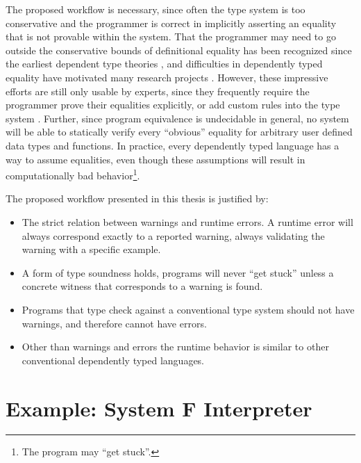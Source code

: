 The proposed workflow is necessary, since often the type system is too conservative and the programmer is correct in implicitly asserting an equality that is not provable within the system.
That the programmer may need to go outside the conservative bounds of definitional equality has been recognized since the earliest dependent type theories \cite{Martin-Lof-1972}, and difficulties in dependently typed equality have motivated many research projects \cite{HoTTbook,sjoberg2015programming,cockx2021taming}.
However, these impressive efforts are still only usable by experts, since they frequently require the programmer prove their equalities explicitly\cite{HoTTbook,sjoberg2015programming}, or add custom rules into the type system \cite{cockx2021taming}.
Further, since program equivalence is undecidable in general, no system will be able to statically verify every ``obvious'' equality for arbitrary user defined data types and functions.
In practice, every dependently typed language has a way to assume equalities, even though these assumptions will result in computationally bad behavior\footnote{The program may ``get stuck''.}.

The proposed workflow presented in this thesis is justified by:
\begin{itemize}
\item The strict relation between warnings and runtime errors.
A runtime error will always correspond exactly to a reported warning, always validating the warning with a specific example.
\item A form of type soundness holds, programs will never ``get stuck'' unless a concrete witness that corresponds to a warning is found.
\item Programs that type check against a conventional type system should not have warnings, and therefore cannot have errors.
\item Other than warnings and errors the runtime behavior is similar to other conventional dependently typed languages.
\end{itemize}

\section{Example: System F Interpreter}

